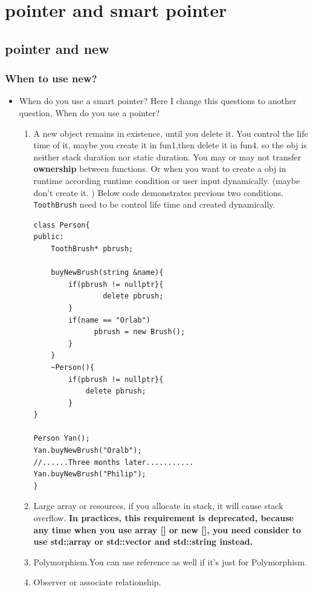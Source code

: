 \documentclass[a4paper,11pt,twoside]{book}
\begin{document}
\chapter{pointer and smart pointer}

\section{pointer and new}

\subsection{When to use new?}
\begin{itemize}

		\item When do you use a smart pointer? Here I change this questions to another question, When do you use a pointer?

\begin{enumerate}

		\item A new object remains in existence, until you delete it. You control the life time of it, maybe you create it in fun1,then delete it in fun4. so the obj is neither stack duration nor static duration. You may or may not transfer \textbf{ownership} between functions. Or when you want to create a obj in runtime according runtime condition or user input dynamically. (maybe don't create it. ) Below code demonstrates previous two conditions.  \texttt{ToothBrush} need to be control life time and created dynamically.

\begin{lstlisting}[numbers=none]
class Person{
public:
	ToothBrush* pbrush;

	buyNewBrush(string &name){
	    if(pbrush != nullptr}{
		    	delete pbrush;
	    }
	    if(name == "Orlab")
	          pbrush = new Brush();
	    }
	}
	~Person(){
		if(pbrush != nullptr}{
			delete pbrush;
	    }
}

Person Yan();
Yan.buyNewBrush("Oralb");
//......Three months later...........
Yan.buyNewBrush("Philip");
}
\end{lstlisting}

		\item Large array or resources,  if you allocate in stack, it will cause stack overflow. \textbf{In practices, this requirement is deprecated, because any time when you use array [] or new [], you need consider to use std::array or std::vector and std::string instead.}

		\item Polymorphism.You can use reference as well if it's just for Polymorphism.

		\item Observer or associate relationship. 
\end{enumerate}

\end{itemize}
\end{document}
